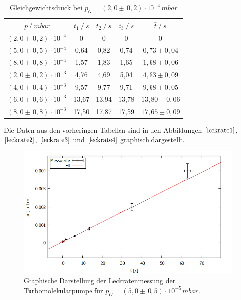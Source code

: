 \begin{table}[H]
\centering
\begin{tabular}{c|c|c|c|c}
	{$p \:/\: \si{mbar}$} & {$t_1 \:/\: \si{s} $} & {$t_2 \:/\: \si{s} $} & {$t_3 \:/\: \si{s} $} & {$\bar{t} \:/\: \si{s}$}\\
\midrule
$(2,0 \pm \, 0,2)\cdot 10^{-4}$ &0 &0 &0 &0\\
$(5,0 \pm \, 0,5)\cdot 10^{-4}$ &   0,64 &  0,82 &  0,74 & $0,73 \pm 0,04$\\
$(8,0 \pm \, 0,8)\cdot 10^{-4}$ &   1,57  &  1,83 &  1,65 & $1,68 \pm 0,06 $\\
$(2,0 \pm \, 0,2)\cdot 10^{-3}$ &   4,76 &  4,69 &  5,04 & $4,83 \pm 0,09 $\\
$(4,0 \pm \, 0,4)\cdot 10^{-3}$ &   9,57 &  9,77 &  9,71 & $9,68 \pm 0,05 $\\
$(6,0 \pm \, 0,6)\cdot 10^{-3}$ &   13,67 &  13,94 &  13,78 & $13,80 \pm 0,06 $\\
$(8,0 \pm \, 0,8)\cdot 10^{-3}$ &  17,50 & 17,87 & 17,59 & $17,65 \pm 0,09 $\\
\end{tabular}
\caption{Gleichgewichtsdruck bei $p_G=(2,0 \pm \, 0,2)\cdot 10^{-4} \, \si{mbar}$}
\label{tab:leck_Turbo4}
\end{table}
Die Daten aus den vorheringen Tabellen sind in den Abbildungen $\ref{leckrate1}$, $\ref{leckrate2}$, $\ref{leckrate3}$ und $\ref{leckrate4}$ graphisch dargestellt.
\begin{figure}[H]
  \centering
  \includegraphics[width=14cm]{bilder/leckratefit1.png}
  \caption{Graphische Darstellung der Leckratenmessung der Turbomolekularpumpe für $p_G=(5,0 \pm \, 0,5)\cdot 10^{-5} \, \si{mbar}$.}
  \label{leckrate1}
\end{figure}
